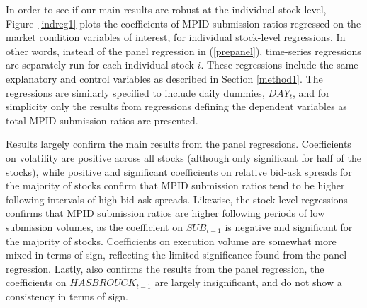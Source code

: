 \documentclass{article}
\begin{document}
In order to see if our main results are robust at the individual stock level, Figure~\ref{indreg1} plots the coefficients of MPID submission ratios regressed on the market condition variables of interest, for individual stock-level regressions. In other words, instead of the panel regression in (\ref{prepanel}), time-series regressions are separately run for each individual stock $i$. These regressions include the same explanatory and control variables as described in Section \ref{method1}. The regressions are similarly specified to include daily dummies, $DAY_t$, and for simplicity only the results from regressions defining the dependent variables as total MPID submission ratios are presented.

Results largely confirm the main results from the panel regressions. Coefficients on volatility are positive across all stocks (although only significant for half of the stocks), while positive and significant coefficients on relative bid-ask spreads for the majority of stocks confirm that MPID submission ratios tend to be higher following intervals of high bid-ask spreads. Likewise, the stock-level regressions confirms that MPID submission ratios are higher following periods of low submission volumes, as the coefficient on $SUB_{t-1}$ is negative and significant for the majority of stocks. Coefficients on execution volume are somewhat more mixed in terms of sign, reflecting the limited significance found from the panel regression. Lastly, also confirms the results from the panel regression, the coefficients on $HASBROUCK_{t-1}$ are largely insignificant, and do not show a consistency in terms of sign.
\end{document}

